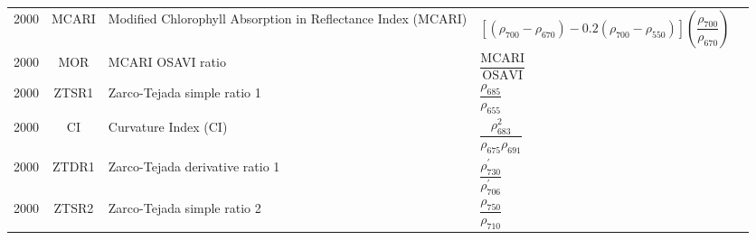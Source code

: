 \documentclass[10pt]{article}
\begin{document}
\begin{ThreePartTable}
\begin{longtable}{c c m{2.80in} M{2.80in} M{1.5in}}
  2000 & MCARI   & Modified Chlorophyll Absorption in Reflectance Index (MCARI)                   & $\left[(\rho_{700}-\rho_{670})-0.2(\rho_{700}-\rho_{550})\right]\left(\dfrac{\rho_{700}}{\rho_{670}}\right)$                                                                                                                                                                            & \citet{Daughtry2000}                                \\
  2000 & MOR     & MCARI OSAVI ratio                                                              & $\dfrac{\text{MCARI}}{\text{OSAVI}}$                                                                                                                                                                                                                                                    & \citet{Daughtry2000}                                \\
  2000 & ZTSR1   & Zarco-Tejada simple ratio 1                                                    & $\dfrac{\rho_{685}}{\rho_{655}}$                                                                                                                                                                                                                                                        & \citet{Zarco-Tejada2000a,Zarco-Tejada2000b}         \\
  2000 & CI      & Curvature Index (CI)                                                           & $\dfrac{\rho_{683}^2}{\rho_{675}\rho_{691}}$                                                                                                                                                                                                                                            & \citet{Zarco-Tejada2000a,Zarco-Tejada2000b}         \\
  2000 & ZTDR1   & Zarco-Tejada derivative ratio 1                                                & $\dfrac{\rho^\prime_{730}}{\rho^\prime_{706}}$                                                                                                                                                                                                                                          & \citet{Zarco-Tejada2000b}                           \\
  2000 & ZTSR2   & Zarco-Tejada simple ratio 2                                                    & $\dfrac{\rho_{750}}{\rho_{710}}$                                                                                                                                                                                                                                                        & \citet{Zarco-Tejada2000b}                           \\

\end{longtable}
\end{ThreePartTable}
\end{document}
